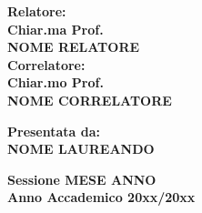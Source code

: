 \documentclass[12pt,a4paper]{report}
\begin{document}
\begin{titlepage}
\vspace{30mm}
\par
\noindent
\begin{minipage}[t]{0.50\textwidth}
{\large{\bf Relatore:\\
Chiar.ma Prof.\\
NOME RELATORE}} \\[5mm]

%
\large{\bf Correlatore: \\
Chiar.mo Prof. \\
NOME CORRELATORE}
\end{minipage}
\hfill
\begin{minipage}[t]{0.47\textwidth}\raggedleft
{\large{\bf Presentata da:\\
NOME LAUREANDO}}
\end{minipage}

\vspace{10mm}
\begin{center}
%
%
{\large{\bf Sessione MESE ANNO \\}}
{\large{\bf Anno Accademico 20xx/20xx\\}}
\end{center}
\end{titlepage}
\end{document}
